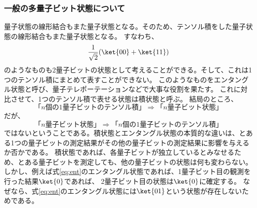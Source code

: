 \documentclass[a4paper,11pt,uplatex]{jsarticle}%
\begin{document}
\subsubsection*{一般の多量子ビット状態について}
量子状態の線形結合もまた量子状態となる。そのため、テンソル積をした量子状態の線形結合もまた量子状態となる。
すなわち、
\begin{equation}
  \frac{1}{\sqrt{2}}(\ket{00}+\ket{11})
  \label{eq:ent}
\end{equation}
のようなものも2量子ビットの状態として考えることができる。そして、これは1つのテンソル積にまとめて表すことができない。
このようなものをエンタングル状態と呼び、量子テレポーテーションなどで大事な役割を果たす。
これに対比させて、1つのテンソル積で表せる状態は積状態と呼ぶ。
結局のところ、
\begin{equation}
  \text{「$n$個の1量子ビットのテンソル積」}\Rightarrow \text{「$n$量子ビット状態」}
\end{equation}
だが、
\begin{equation}
  \text{「$n$量子ビット状態」} \Rightarrow \text{「$n$個の1量子ビットのテンソル積」}
\end{equation}
ではないということである。積状態とエンタングル状態の本質的な違いは、とある1つの量子ビットの測定結果がその他の量子ビットの測定結果に影響を与えるか否かである。
積状態であれば、各量子ビットが独立しているとみなせるため、とある量子ビットを測定しても、他の量子ビットの状態は何も変わらない。
しかし、例えば式\eqref{eq:ent}のエンタングル状態であれば、1量子ビット目の観測を行った結果$\ket{0}$であれば、
2量子ビット目の状態は$\ket{0}$に確定する。
なぜなら、式\eqref{eq:ent}のエンタングル状態には$\ket{01}$という状態が存在しないためである。
\end{document}
